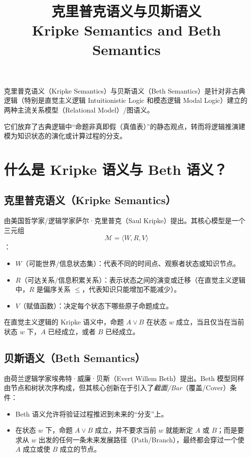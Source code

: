 \documentclass[UTF8,a4paper,11pt]{ctexart}
\title{克里普克语义与贝斯语义\\[0.5em]
\large Kripke Semantics and Beth Semantics}
\author{}
\date{}
\begin{document}
\maketitle

克里普克语义（Kripke Semantics）与贝斯语义（Beth Semantics）是针对非古典逻辑（特别是直觉主义逻辑 Intuitionistic Logic 和模态逻辑 Modal Logic）建立的两种主流关系模型（Relational Model）/图语义。

它们放弃了古典逻辑中“命题非真即假（真值表）”的静态观点，转而将逻辑推演建模为知识状态的演化或计算过程的分支。

\section{什么是 Kripke 语义与 Beth 语义？}

\subsection{克里普克语义（Kripke Semantics）}

由美国哲学家/逻辑学家萨尔·克里普克（Saul Kripke）提出。其核心模型是一个三元组
\[
\mathcal{M} = \langle W, R, V \rangle
\]：

\begin{itemize}[leftmargin=2em]
  \item $W$（可能世界/信息状态集）：代表不同的时间点、观察者状态或知识节点。
  \item $R$（可达关系/信息积累关系）：表示状态之间的演变或迁移（在直觉主义逻辑中，$R$ 是偏序关系 $\leqslant$，代表知识只能增加不能减少）。
  \item $V$（赋值函数）：决定每个状态下哪些原子命题成立。
\end{itemize}

在直觉主义逻辑的 Kripke 语义中，命题 $A \lor B$ 在状态 $w$ 成立，当且仅当在当前状态 $w$ 下，$A$ 已经成立，或者 $B$ 已经成立。

\subsection{贝斯语义（Beth Semantics）}

由荷兰逻辑学家埃弗特·威廉·贝斯（Evert Willem Beth）提出。Beth 模型同样由节点和树状次序构成，但其核心创新在于引入了\emph{截面/Bar}（覆盖/Cover）条件：

\begin{itemize}[leftmargin=2em]
  \item Beth 语义允许将验证过程推迟到未来的“分支”上。
  \item 在状态 $w$ 下，命题 $A \lor B$ 成立，并不要求当前 $w$ 就能断定 $A$ 或 $B$；而是要求从 $w$ 出发的任何一条未来发展路径（Path/Branch），最终都会穿过一个使 $A$ 成立或使 $B$ 成立的节点。
\end{itemize}
\end{document}
